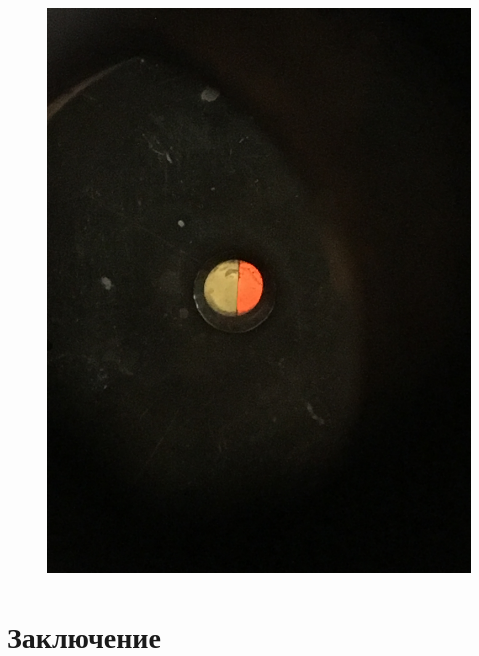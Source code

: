 \begin{figure}[h!]
\begin{minipage}{0.25\linewidth}
		\includegraphics[width=\linewidth]{biquarz/green-orange.jpg}
	\end{minipage}
\end{figure}

\newpage
\section{Заключение}
